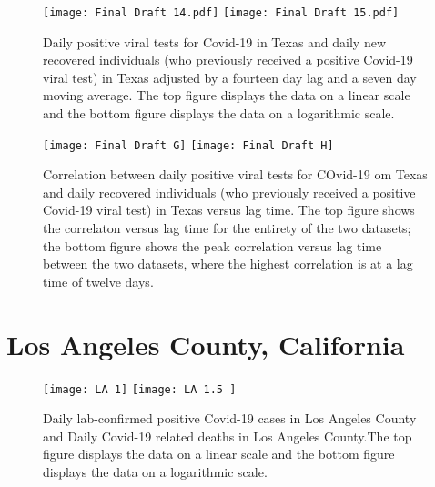 \documentclass{article}
\begin{document}
\FloatBarrier

\begin{figure}[!htbp]
	\begin{center}
		\texttt{[image: Final Draft 14.pdf]}
		\vspace{1mm}
		\texttt{[image: Final Draft 15.pdf]}
		\caption{Daily positive viral tests for Covid-19 in Texas and daily new recovered individuals (who previously received a positive Covid-19 viral test) in Texas adjusted by a fourteen day lag and a seven day moving average. The top figure displays the data on a linear scale and the bottom figure displays the data on a logarithmic scale. }
		\label{fig:5}
	\end{center}
\end{figure}

\FloatBarrier

\begin{figure}[!htbp]
	\begin{center}
		\texttt{[image: Final Draft G]}
		\vspace{1mm}
		\texttt{[image: Final Draft H]}
		\caption{Correlation between daily positive viral tests for COvid-19 om Texas and daily recovered individuals (who previously received a positive Covid-19 viral test) in Texas versus lag time. The top figure shows the correlaton versus lag time for the entirety of the two datasets; the bottom figure shows the peak correlation versus lag time between the two datasets, where the highest correlation is at a lag time of twelve days. }
		\label{fig:6}
	\end{center}
\end{figure}

\FloatBarrier

\section{Los Angeles County, California}

\begin{figure}[!htbp]
	\begin{center}
		\texttt{[image: LA 1]}
		\vspace{1mm}
		\texttt{[image: LA 1.5 ]}
		\caption{Daily lab-confirmed positive Covid-19 cases in Los Angeles County and Daily Covid-19 related deaths in Los Angeles County.The top figure displays the data on a linear scale and the bottom figure displays the data on a logarithmic scale.  }
		\label{fig:7}
	\end{center}
\end{figure}
\end{document}
